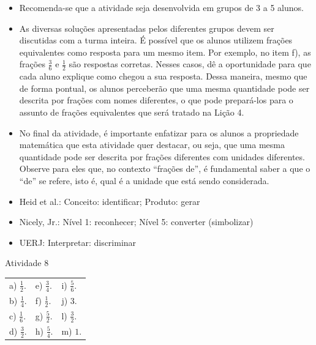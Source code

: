 \begin{multicols}{2}

  \vspace{.1cm}

  \begin{itemize} %
    \item       Recomenda-se que a atividade seja desenvolvida em grupos de 3 a 5 alunos.
    \item       As diversas soluções apresentadas pelos diferentes grupos devem ser discutidas com a turma inteira. É possível que os alunos utilizem frações equivalentes como resposta para um mesmo item. Por exemplo, no item f), as frações       $\frac{3}{6}$ e       $\frac{1}{2}$ são respostas corretas. Nesses casos, dê a oportunidade para que cada aluno explique como chegou a sua resposta. Dessa maneira, mesmo que de forma pontual, os alunos perceberão que uma mesma quantidade pode ser descrita por frações com nomes diferentes, o que pode prepará-los para o assunto de frações equivalentes que será tratado na Lição 4.
    \item       No final da atividade, é importante enfatizar para os alunos a propriedade matemática que esta atividade quer destacar, ou seja, que uma mesma quantidade pode ser descrita por frações diferentes com unidades diferentes. Observe para eles que, no contexto       ``frações de'', é fundamental saber a que o       ``de''     se refere, isto é, qual é a unidade que está sendo considerada.
\end{itemize} %


  \vspace{.1cm}

 \vspace{.1cm}
\begin{itemize} %
    \item       Heid et al.: Conceito: identificar; Produto: gerar
    \item       Nicely, Jr.: Nível 1: reconhecer; Nível 5: converter (simbolizar)
    \item       UERJ: Interpretar: discriminar
\end{itemize} %

\newpage
\end{multicols}
\begin{resposta*}{Atividade 8}
\begin{tabular}{m{}m{}m{}}
    a) $\frac{1}{2}$. & e) $\frac{3}{4}$. &  i) $\frac{5}{6}$.\\
    b) $\frac{1}{4}$. & f) $\frac{1}{2}$. &  j) $3$.\\
    c) $\frac{1}{6}$. & g) $\frac{5}{2}$. &  l) $\frac{3}{2}$.\\
    d) $\frac{3}{2}$. & h) $\frac{5}{4}$. &  m) $1$.
\end{tabular} %

\end{resposta*}


